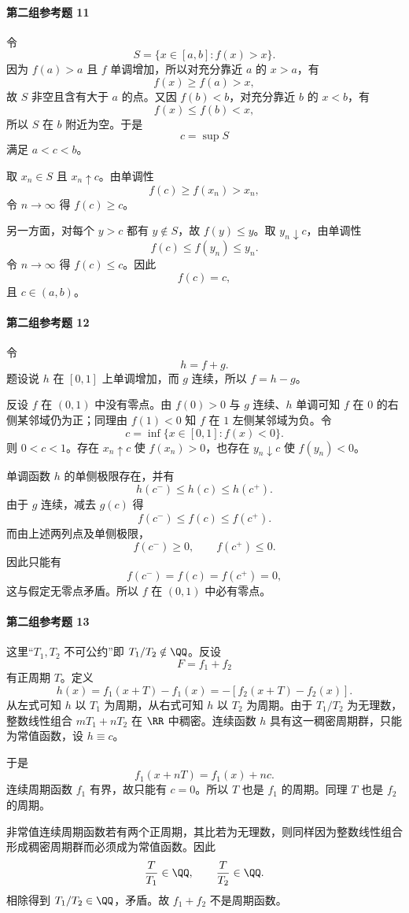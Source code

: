 \paragraph{第二组参考题 11}
\begin{xsolution}
令
\[
 S=\{x\in[a,b]:f(x)>x\}.
\]
因为 $f(a)>a$ 且 $f$ 单调增加，所以对充分靠近 $a$ 的 $x>a$，有
\[
 f(x)\ge f(a)>x,
\]
故 $S$ 非空且含有大于 $a$ 的点。又因 $f(b)<b$，对充分靠近 $b$ 的 $x<b$，有
\[
 f(x)\le f(b)<x,
\]
所以 $S$ 在 $b$ 附近为空。于是
\[
 c=\sup S
\]
满足 $a<c<b$。

取 $x_n\in S$ 且 $x_n\uparrow c$。由单调性
\[
 f(c)\ge f(x_n)>x_n,
\]
令 $n\to\infty$ 得 $f(c)\ge c$。

另一方面，对每个 $y>c$ 都有 $y\notin S$，故 $f(y)\le y$。取 $y_n\downarrow c$，由单调性
\[
 f(c)\le f(y_n)\le y_n.
\]
令 $n\to\infty$ 得 $f(c)\le c$。因此
\[
 f(c)=c,
\]
且 $c\in(a,b)$。
\end{xsolution}

\paragraph{第二组参考题 12}
\begin{xsolution}
令
\[
 h=f+g.
\]
题设说 $h$ 在 $[0,1]$ 上单调增加，而 $g$ 连续，所以 $f=h-g$。

反设 $f$ 在 $(0,1)$ 中没有零点。由 $f(0)>0$ 与 $g$ 连续、$h$ 单调可知 $f$ 在 $0$ 的右侧某邻域仍为正；同理由 $f(1)<0$ 知 $f$ 在 $1$ 左侧某邻域为负。令
\[
 c=\inf\{x\in[0,1]:f(x)<0\}.
\]
则 $0<c<1$。存在 $x_n\uparrow c$ 使 $f(x_n)>0$，也存在 $y_n\downarrow c$ 使 $f(y_n)<0$。

单调函数 $h$ 的单侧极限存在，并有
\[
 h(c^-)\le h(c)\le h(c^+).
\]
由于 $g$ 连续，减去 $g(c)$ 得
\[
 f(c^-)\le f(c)\le f(c^+).
\]
而由上述两列点及单侧极限，
\[
 f(c^-)\ge0,
 \qquad f(c^+)\le0.
\]
因此只能有
\[
 f(c^-)=f(c)=f(c^+)=0,
\]
这与假定无零点矛盾。所以 $f$ 在 $(0,1)$ 中必有零点。
\end{xsolution}

\paragraph{第二组参考题 13}
\begin{xsolution}
这里“$T_1,T_2$ 不可公约”即 $T_1/T_2\notin\QQ$。反设
\[
 F=f_1+f_2
\]
有正周期 $T$。定义
\[
 h(x)=f_1(x+T)-f_1(x)
 =-[f_2(x+T)-f_2(x)].
\]
从左式可知 $h$ 以 $T_1$ 为周期，从右式可知 $h$ 以 $T_2$ 为周期。由于 $T_1/T_2$ 为无理数，整数线性组合 $mT_1+nT_2$ 在 $\RR$ 中稠密。连续函数 $h$ 具有这一稠密周期群，只能为常值函数，设 $h\equiv c$。

于是
\[
 f_1(x+nT)=f_1(x)+nc.
\]
连续周期函数 $f_1$ 有界，故只能有 $c=0$。所以 $T$ 也是 $f_1$ 的周期。同理 $T$ 也是 $f_2$ 的周期。

非常值连续周期函数若有两个正周期，其比若为无理数，则同样因为整数线性组合形成稠密周期群而必须成为常值函数。因此
\[
 \frac{T}{T_1}\in\QQ,
 \qquad
 \frac{T}{T_2}\in\QQ.
\]
相除得到 $T_1/T_2\in\QQ$，矛盾。故 $f_1+f_2$ 不是周期函数。
\end{xsolution}

